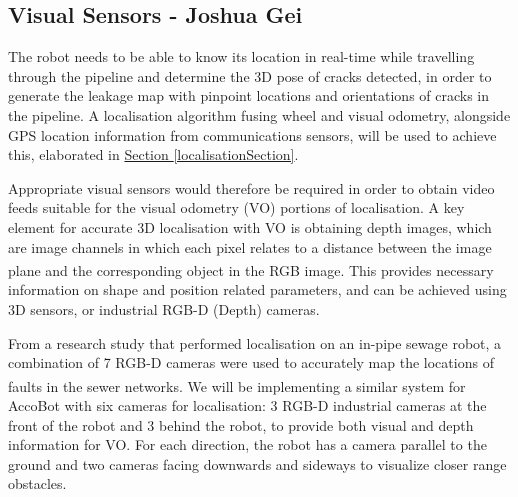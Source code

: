 \documentclass[11pt]{article}		%
\newcommand{\supercite}[1]{\textsuperscript{\cite{#1}}}		%
\newcommand{\sectref}[1]{\hyperref[#1]{Section \ref*{#1}}}     %
\begin{document}
	        
		
		\subsection[Visual Sensors]{Visual Sensors - Joshua Gei}
        \label{visualSensors}
	        The robot needs to be able to know its location in real-time while travelling through the pipeline and determine the 3D pose of cracks detected, in order to generate the leakage map with pinpoint locations and orientations of cracks in the pipeline. A localisation algorithm fusing wheel and visual odometry, alongside GPS location information from communications sensors, will be used to achieve this, elaborated in \sectref{localisationSection}.
            
            Appropriate visual sensors would therefore be required in order to obtain video feeds suitable for the visual odometry (VO) portions of localisation. A key element for accurate 3D localisation with VO is obtaining depth images, which are image channels in which each pixel relates to a distance between the image plane and the corresponding object in the RGB image\supercite{visualodometry}. This provides necessary information on shape and position related parameters, and can be achieved using 3D sensors, or industrial RGB-D (Depth) cameras.
            
	        From a research study that performed localisation on an in-pipe sewage robot, a combination of 7 RGB-D cameras were used to accurately map the locations of faults in the sewer networks\supercite{sewerpaper}. We will be implementing a similar system for AccoBot with six cameras for localisation: 3 RGB-D industrial cameras at the front of the robot and 3 behind the robot, to provide both visual and depth information for VO. For each direction, the robot has a camera parallel to the ground and two cameras facing downwards and sideways to visualize closer range obstacles. 
	        
\end{document}
